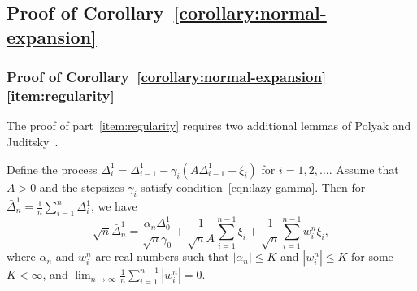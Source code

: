 

\subsection{Proof of Corollary~\ref{corollary:normal-expansion}}
\label{proof:normal-expansion}

\subsubsection*{Proof of
  Corollary~\ref{corollary:normal-expansion}\eqref{item:regularity}}

The proof of part~\eqref{item:regularity} requires two additional lemmas of
Polyak and Juditsky~\cite{polyak1992acceleration}.
\begin{lem}
  \label{lemma:polyak-expansion}
  Define the process $\Delta_i^1 = \Delta_{i-1}^1
  - \gamma_i (A \Delta_{i-1}^1 + \xi_i)$ for $i = 1, 2, \ldots$.
  Assume that $A>0$ and the stepsizes $\gamma_i$ satisfy
  condition~\eqref{eqn:lazy-gamma}. Then
  for $\bar{\Delta}_n^1 = \frac{1}{n} \sum_{i = 1}^n \Delta_i^1$, we have
  \begin{equation}
    \label{eqn:polyak-expansion}
    \sqrt{n} \bar{\Delta}_n^1
    = \frac{\alpha_n \Delta_0^1}{\sqrt{n} \gamma_0}
    + \frac{1}{\sqrt{n} A} \sum_{i=1}^{n-1} \xi_i
    + \frac{1}{\sqrt{n}}\sum_{i=1}^{n-1} w_i^n \xi_i,
  \end{equation}
  where $\alpha_n$ and $w_i^n$ are real numbers such that $|\alpha_n| \leq
  K$ and $|w_i^n|\leq K$ for some $K< \infty$, and $\lim_{n\to \infty}
  \frac{1}{n} \sum_{i=1}^{n-1} |w_i^n| = 0$.
\end{lem} 

